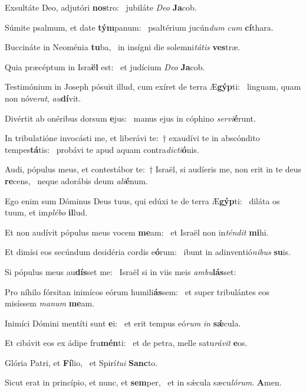 \item Exsultáte Deo, adjutóri \textbf{nos}tro:~\psstar{} jubiláte \textit{Deo} \textbf{Ja}cob.
\item Súmite psalmum, et date \textbf{tým}panum:~\psstar{} psaltérium jucún\textit{dum} \textit{cum} \textbf{cí}thara.
\item Buccináte in Neoménia \textbf{tu}ba,~\psstar{} in insígni die solemni\textit{tátis} \textbf{ves}træ.
\item Quia præcéptum in Isra\textbf{ël} est:~\psstar{} et judícium \textit{Deo} \textbf{Ja}cob.
\item Testimónium in Joseph pósuit illud, cum exíret de terra Æ\textbf{gýp}ti:~\psstar{} linguam, quam non nóve\textit{rat}, \textit{au}\textbf{dí}vit.
\item Divértit ab onéribus dorsum \textbf{e}jus:~\psstar{} manus ejus in cóphino \textit{servi}\textbf{é}runt.
\item In tribulatióne invocásti me, et liberávi te:~† exaudívi te in abscóndito tempes\textbf{tá}tis:~\psstar{} probávi te apud aquam contra\textit{dicti}\textbf{ó}nis.
\item Audi, pópulus meus, et contestábor te:~† Israël, si audíeris me, non erit in te deus \textbf{re}cens,~\psstar{} neque adorábis deum \textit{ali}\textbf{é}num.
\item Ego enim sum Dóminus Deus tuus, qui edúxi te de terra Æ\textbf{gýp}ti:~\psstar{} diláta os tuum, et im\textit{plébo} \textbf{il}lud.
\item Et non audívit pópulus meus vocem \textbf{me}am:~\psstar{} et Israël non in\textit{téndit} \textbf{mi}hi.
\item Et dimísi eos secúndum desidéria cordis e\textbf{ó}rum:~\psstar{} ibunt in adinventió\textit{nibus} \textbf{su}is.
\item Si pópulus meus au\textbf{dís}set me:~\psstar{} Israël si in viis meis \textit{ambu}\textbf{lás}set:
\item Pro níhilo fórsitan inimícos eórum humili\textbf{ás}sem:~\psstar{} et super tribulántes eos misíssem \textit{manum} \textbf{me}am.
\item Inimíci Dómini mentíti sunt \textbf{e}i:~\psstar{} et erit tempus eó\textit{rum} \textit{in} \textbf{sǽ}cula.
\item Et cibávit eos ex ádipe fru\textbf{mén}ti:~\psstar{} et de petra, melle satu\textit{rávit} \textbf{e}os.
\item Glória Patri, et \textbf{Fí}lio,~\psstar{} et Spirí\textit{tui} \textbf{Sanc}to.
\item Sicut erat in princípio, et nunc, et \textbf{sem}per,~\psstar{} et in sǽcula sæcu\textit{lórum}. \textbf{A}men.
